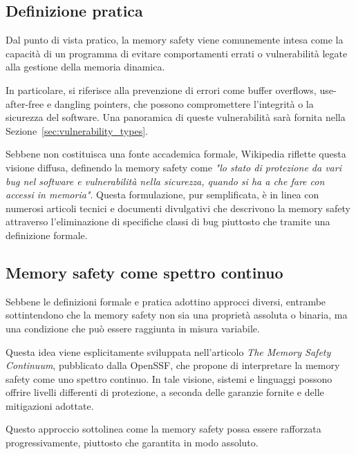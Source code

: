 \subsection{Definizione pratica}
\label{sec:practical_definition}

Dal punto di vista pratico, la memory safety viene comunemente intesa come la
capacità di un programma di evitare comportamenti errati o vulnerabilità legate
alla gestione della memoria dinamica.

In particolare, si riferisce alla prevenzione di errori come buffer overflows,
use-after-free e dangling pointers, che possono compromettere l'integrità o la sicurezza
del software. Una panoramica di queste vulnerabilità sarà fornita nella Sezione~\ref{sec:vulnerability_types}.

Sebbene non costituisca una fonte accademica formale, Wikipedia\cite{wikipedia_definition}
riflette questa visione diffusa, definendo la memory safety come \textit{"lo stato
di protezione da vari bug nel software e vulnerabilità nella sicurezza, quando
si ha a che fare con accessi in memoria"}. Questa formulazione, pur semplificata,
è in linea con numerosi articoli tecnici e documenti divulgativi che descrivono la
memory safety attraverso l'eliminazione di specifiche classi di bug piuttosto che
tramite una definizione formale.

\subsection{Memory safety come spettro continuo}
\label{sec:continuum_definition}

Sebbene le definizioni formale e pratica adottino approcci diversi, entrambe sottintendono
che la memory safety non sia una proprietà assoluta o binaria, ma una condizione
che può essere raggiunta in misura variabile.

Questa idea viene esplicitamente sviluppata nell'articolo \textit{The Memory
Safety Continuum}\cite{memory_safety_continuum}, pubblicato dalla OpenSSF, che
propone di interpretare la memory safety come uno spettro continuo. In tale visione,
sistemi e linguaggi possono offrire livelli differenti di protezione, a seconda delle
garanzie fornite e delle mitigazioni adottate.

Questo approccio sottolinea come la memory safety possa essere rafforzata progressivamente,
piuttosto che garantita in modo assoluto.